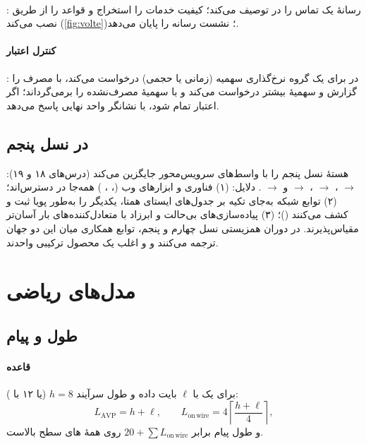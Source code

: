 \documentclass[11pt,a4paper]{article}
\begin{document}
\paragraph{} \cite{ts29214}:  رسانهٔ یک تماس را در  توصیف می‌کند؛  کیفیت خدمات را
استخراج و قواعد را از طریق  نصب می‌کند (\cref{fig:volte})؛  نشست رسانه را پایان می‌دهد.
\paragraph{کنترل اعتبار } \cite{rfc8506}:  در  برای یک گروه نرخ‌گذاری سهمیه (زمانی
یا حجمی) درخواست می‌کند، با  مصرف را گزارش و سهمیهٔ بیشتر درخواست می‌کند و با 
سهمیهٔ مصرف‌نشده را برمی‌گرداند؛ اگر اعتبار تمام شود،  با نشانگر واحد نهایی پاسخ می‌دهد.

\subsection{ در نسل پنجم}
هستهٔ نسل پنجم  را با واسط‌های سرویس‌محور  جایگزین می‌کند (درس‌های ۱۸ و ۱۹):
 $\to$ ،  $\to$ ،  $\to$
 و  $\to$ . دلایل: (۱) فناوری و ابزارهای وب (،
، ) همه‌جا در دسترس‌اند؛ (۲) توابع شبکه به‌جای تکیه بر جدول‌های ایستای همتا، یکدیگر را به‌طور
پویا ثبت و کشف می‌کنند ()؛ (۳) پیاده‌سازی‌های بی‌حالت و ابرزاد با متعادل‌کننده‌های بار  آسان‌تر
مقیاس‌پذیرند. در دوران همزیستی نسل چهارم و پنجم، توابع همکاری میان این دو جهان ترجمه می‌کنند و  و
 اغلب یک محصول ترکیبی واحدند.

\section{مدل‌های ریاضی}

\subsection{طول  و پیام}\label{sec:len}
\paragraph{قاعده} برای یک  با $\ell$ بایت داده و طول سرآیند $h = 8$ (یا ۱۲ با ):
\begin{equation}\label{eq:avplen}
  L_{\mathrm{AVP}} = h + \ell, \qquad
  L_{\mathrm{on\,wire}} = 4\left\lceil \frac{h+\ell}{4}\right\rceil,
\end{equation}
و طول پیام برابر $20 + \sum L_{\mathrm{on\,wire}}$ روی همهٔ های سطح بالاست.
\end{document}
